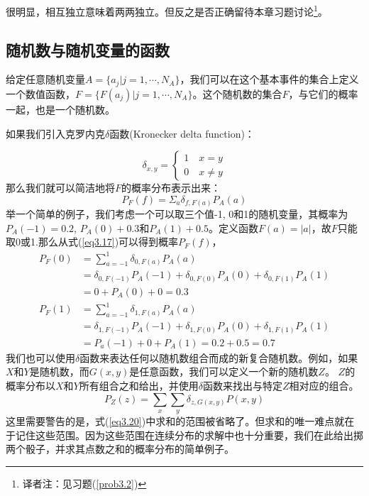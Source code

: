 \documentclass[UTF8]{ctexart}
\numberwithin{equation}{section}%
\numberwithin{figure}{section}%
\begin{document}
    很明显，相互独立意味着两两独立。但反之是否正确留待本章习题讨论\footnote{译者注：见习题(\ref{prob3.2})}。

    \subsection{随机数与随机变量的函数}\label{sec3.4}
    给定任意随机变量$A=\{a_j|j=1,\cdots ,N_A\}$，我们可以在这个基本事件的集合上定义一个数值函数，$F=\{F(a_j)|j=1,\cdots ,N_A\}$。这个随机数的集合$F$，与它们的概率一起，也是一个随机数。

    如果我们引入克罗内克$\delta$函数(Kronecker delta function)：

    \begin{equation}
    \delta_{x,y}=\left\{
        \begin{aligned}
        1\quad x=y \\
        0\quad x\neq y 
        \end{aligned}
        \right.
    \end{equation}
    那么我们就可以简洁地将$F$的概率分布表示出来：
    \begin{equation}\label{eq3.17}
        P_F(f)=\Sigma_a \delta_{f,F(a)}P_A(a)
    \end{equation}
    举一个简单的例子，我们考虑一个可以取三个值-1, 0和1的随机变量，其概率为$P_A(-1)=0.2$, $P_A(0)+0.3$和$P_A(1)+0.5$。定义函数$F(a)=|a|$，故$F$只能取0或1.那么从式(\ref{eq3.17})可以得到概率$P_F(f)$，
    \begin{equation}
        \begin{aligned}
            P_F(0)&=\sum^1_{a=-1}\delta_{0,F(a)}P_A(a)\\
            &=\delta_{0,F(-1)}P_A(-1)+\delta_{0,F(0)}P_A(0)+\delta_{0,F(1)}P_A(1)\\
            &=0+P_A (0)+0=0.3
        \end{aligned}
    \end{equation}
    \begin{equation}
        \begin{aligned}
            P_F(1)&=\sum^1_{a=-1}\delta_{1,F(a)}P_A(a)\\
            &=\delta_{1,F(-1)}P_A(-1)+\delta_{1,F(0)}P_A(0)+\delta_{1,F(1)}P_A(1)\\
            &=P_a(-1)+0+P_A(1)=0.2+0.5=0.7
        \end{aligned}
    \end{equation}
    我们也可以使用$\delta$函数来表达任何以随机数组合而成的新复合随机数。例如，如果$X$和$Y$是随机数，而$G(x,y)$是任意函数，我们可以定义一个新的随机数$Z$。
    $Z$的概率分布以$X$和$Y$所有组合之和给出，并使用$\delta$函数来找出与特定$Z$相对应的组合。
    \begin{equation}\label{eq3.20}
        P_Z(z)=\sum_x\sum_y\delta_{z,G(x,y)}P(x,y)
    \end{equation}
    这里需要警告的是，式(\ref{eq3.20})中求和的范围被省略了。但求和的唯一难点就在于记住这些范围。因为这些范围在连续分布的求解中也十分重要，我们在此给出掷两个骰子，并求其点数之和的概率分布的简单例子。
\end{document}
